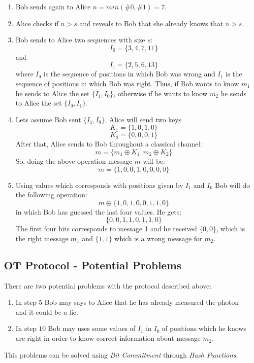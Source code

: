 \begin{enumerate}
  \item Bob sends again to Alice $n=min(\#0,\#1)=7.$

  \item Alice checks if $n>s$ and reveals to Bob that she already knows that $n>s$.

  \item Bob sends to Alice two sequences with size $s$:
  $$I_{0}=\{3,4,7,11 \}$$
  and $$I_{1}= \{2,5,6,13 \}$$ where $I_{0}$ is the sequence of positions in which Bob was wrong and $I_{1}$ is the sequence of positions in which Bob was right. Thus, if Bob wants to know $m_{1}$ he sends to Alice the set $\{I_{1},I_{0} \}$, otherwise if he wants to know $m_{2}$ he sends to Alice the set $\{I_{0},I_{1} \}$.

  \item Lets assume Bob sent $\{I_{1},I_{0} \}$, Alice will send two keys $$K_{1}=\{1,0,1,0\}$$ $$K_{2}=\{0,0,0,1\}$$ After that, Alice sends to Bob throughout a classical channel: $$m = \{m_{1}\oplus K_{1}, m_{2} \oplus K_{2} \}$$ So, doing the above operation message $m$ will be: $$m=\{1,0,0,1,0,0,0,0\}$$

  \item Using values which corresponds with positions given by $I_{1}$ and $I_{0}$ Bob will do the following operation: $$m \oplus \{1,0,1,0,0,1,1,0 \}$$ in which Bob has guessed the last four values. He gets: $$\{0,0,1,1,0,1,1,0\}$$ The first four bits corresponds to message 1 and he received $\{0,0\}$, which is the right message $m_{1}$ and $\{1,1\}$ which is a wrong message for $m_{2}$.


\end{enumerate}

\subsection{OT Protocol - Potential Problems}
There are two potential problems with the protocol described above:
\begin{enumerate}
  \item In step $5$ Bob may says to Alice that he has already measured the photon and it could be a lie.

  \item In step $10$ Bob may uses some values of $I_{1}$ in $I_{0}$ of positions which he knows are right in order to know correct information about message $m_{2}$.
\end{enumerate}

This problems can be solved using \textit{Bit Commitment} through \textit{Hash Functions}.

